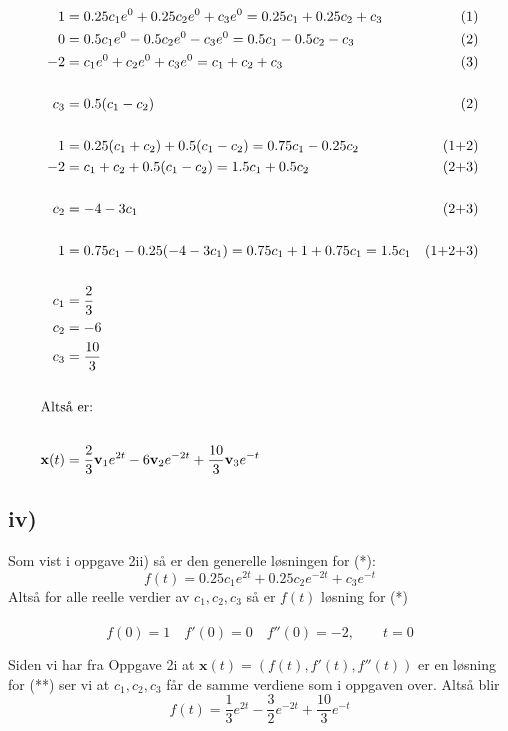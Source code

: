 \documentclass[a4paper, norsk, twoside, 10pt]{article}
\begin{document}
\begin{flushleft}
  \begin{align*}
    1 &= 0.25c_{1}e^{0} + 0.25c_{2}e^{0} + c_{3}e^{0} = 0.25c_{1} + 0.25c_{2} +c_{3} &\text{(1)}\\
    0 &= 0.5c_{1}e^{0} - 0.5c_{2}e^{0} - c_{3}e^{0} = 0.5c_{1} -0.5c_{2} - c_{3} & \text{(2)}\\
    -2 &=c_{1}e^{0} + c_{2}e^{0} + c_{3}e^{0} = c_{1} + c_{2} + c_{3} & \text{(3)}\\
    \ \\
    c_{3} &= 0.5(c_{1} - c_{2})  &\text{(2)}\\
    \ \\
    1 &= 0.25(c_{1} + c_{2}) + 0.5(c_{1} - c_{2}) = 0.75c_{1} -0.25c_{2} & \text{(1+2)}\\
    -2 &= c_{1} + c_{2} + 0.5(c_{1} - c_{2}) = 1.5 c_{1} + 0.5c_{2} & \text{(2+3)} \\
    \ \\
    c_{2} &= -4 -3c_{1} & \text{(2+3)} \\
    \ \\
    1 &= 0.75 c_{1} - 0.25(-4 -3c_{1}) = 0.75c_{1} + 1 + 0.75c_{1} = 1.5 c_{1} & \text{(1+2+3)}\\
    \ \\
    c_{1} &= \frac{2}{3} &\\
    c_{2} &= -6 &\\
    c_{3} &= \frac{10}{3} &\\
    \ \\
    \intertext{Altså er:} \\
    \mathbf{x}(t) &= \frac{2}{3}\mathbf{v}_{1}e^{2t} -6\mathbf{v}_{2}e^{-2t} + \frac{10}{3}\mathbf{v}_{3}e^{-t} \\
  \end{align*}




  \subsection*{iv)}
  Som vist i oppgave 2ii) så er den generelle løsningen for (*):
  \[f(t) = 0.25c_{1}e^{2t} + 0.25c_{2}e^{-2t} + c_{3}e^{-t} \]
  Altså for alle reelle verdier av $c_{1}, c_{2}, c_{3}$ så er $f(t)$ løsning for (*)
  \\
  \ \\
  \[f(0) = 1 \quad f'(0) = 0 \quad f''(0) = -2, \qquad t = 0\]

  Siden vi har fra Oppgave 2i at $\mathbf{x}(t)  = (f(t) , f'(t) , f''(t))$ er en løsning for (**) ser vi at $c_{1}, c_{2}, c_{3}$ får de samme verdiene som i oppgaven over. Altså blir
  \[f(t) = \frac{1}{3}e^{2t} - \frac{3}{2}e^{-2t} + \frac{10}{3}e^{-t}\]




\end{flushleft}
\end{document}
